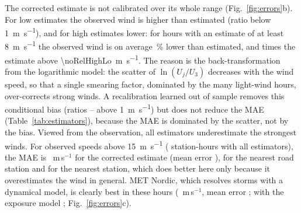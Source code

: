 \begin{table}[!htbp]
\centering
\caption{Estimators of the roadside wind, Norway, all out of time and out of station (Section~\ref{sec:baselines}). Speed: median over the \noTrv{} stations of the station MAE, with 95\,\% station-bootstrap interval, and median ratio-of-means bias, on the hours common to the estimators of each block (hence small differences from the values in the text). Direction: median station MAE for observed and nearest-station speeds $\geq\SI{2}{m.s^{-1}}$. Energy: hourly one-way air-drag energy of a tractor--semitrailer at \SI{80}{km.h^{-1}} at the \noDirOkN{} stations with direction coverage; MAE in kWh/100\,km with the speed MAE in m\,s$^{-1}$, pooled skill relative to ignoring the wind with 95\,\% interval, number of sites with positive skill (of \enNoStations), and correlation of the long-term penalty of the station sites with the observed one. Lower block: every third hour, when MET Nordic is available.}
\label{tab:estimators}
\footnotesize\setlength{\tabcolsep}{2.5pt}
\resizebox{\textwidth}{!}{}
\end{table}

The corrected estimate is not calibrated over its whole range (Fig.~\ref{fig:errors}b). For low estimates the observed wind is higher than estimated (ratio \noRelLow{} below \SI{1}{m.s^{-1}}), and for high estimates lower: for hours with an estimate of at least \SI{8}{m.s^{-1}} the observed wind is on average \noRelEight\,\% lower than estimated, and \noRelHigh{} times the estimate above \SI{\noRelHighLo}{m.s^{-1}}. The reason is the back-transformation from the logarithmic model: the scatter of $\ln(U_j/U_3)$ decreases with the wind speed, so that a single smearing factor, dominated by the many light-wind hours, over-corrects strong winds. A recalibration learned out of sample removes this conditional bias (ratios \noRelCalMin--\noRelCalMax{} above \SI{1}{m.s^{-1}}) but does not reduce the MAE (Table~\ref{tab:estimators}), because the MAE is dominated by the scatter, not by the bias. Viewed from the observation, all estimators underestimate the strongest winds. For observed speeds above \SI{15}{m.s^{-1}} (\noStrongObsN{} station-hours with all estimators), the MAE is \noStrongObsCor~m\,s$^{-1}$ for the corrected estimate (mean error \noStrongObsMeCor), \noStrongObsRoad{} for the nearest road station and \noStrongObsRaw{} for the nearest station, which does better here only because it overestimates the wind in general. MET Nordic, which resolves storms with a dynamical model, is clearly best in these hours (\noStrongObsMn~m\,s$^{-1}$, mean error \noStrongObsMeMn; with the exposure model \noStrongObsMnExp; Fig.~\ref{fig:errors}c).

